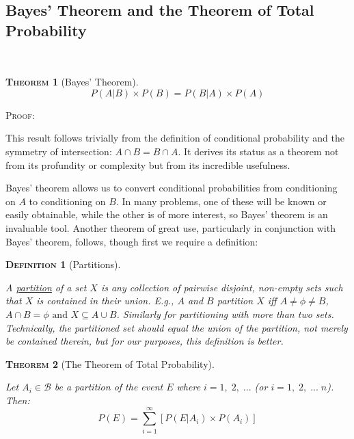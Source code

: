 \documentclass[12pt,a4paper]{article}
\newtheorem{definition}{\textsc{Definition}}[section]
\newtheorem{theorem}{\textsc{Theorem}}[section]
\begin{document}
\subsection{Bayes' Theorem and the Theorem of Total Probability}\label{total prob}$\;$

\begin{theorem}[Bayes' Theorem]
$$P(A|B) \times P(B) = P(B|A) \times P(A)$$
\end{theorem}

\noindent \textsc{Proof:}\par
\vspace{12pt}
\indent This result follows trivially from the definition of conditional probability and the symmetry of intersection: $A \cap B = B \cap A$. It derives its status as a theorem not from its profundity or complexity but from its incredible usefulness.

Bayes' theorem allows us to convert conditional probabilities from conditioning on $A$ to conditioning on $B$. In many problems, one of these will be known or easily obtainable, while the other is of more interest, so Bayes' theorem is an invaluable tool. Another theorem of great use, particularly in conjunction with Bayes' theorem, follows, though first we require a definition:

\begin{definition}[Partitions]$\;$\par
\vspace{12pt}

A \underline{partition} of a set $X$ is any collection of pairwise disjoint, non-empty sets such that $X$ is contained in their union. E.g., $A$ and $B$ partition $X$ iff $A\neq \phi \neq B$, $A \cap B = \phi \text{ and } X \subseteq A \cup B$. Similarly for partitioning with more than two sets. Technically, the partitioned set should \emph{equal} the union of the partition, not merely be contained therein, but for our purposes, this definition is better.

\end{definition}

\begin{theorem}[The Theorem of Total Probability]$\;$\par
\vspace{12pt}

Let $A_i \in \mathcal{B}$ be a partition of the event $E$ where $i = 1,\;2,\;...$ (or $i = 1,\;2,\;...\;n$). Then:
$$P(E) = \sum_{i=1}^{\infty}[P(E|A_i) \times P(A_i)]$$
\end{theorem}
\end{document}
